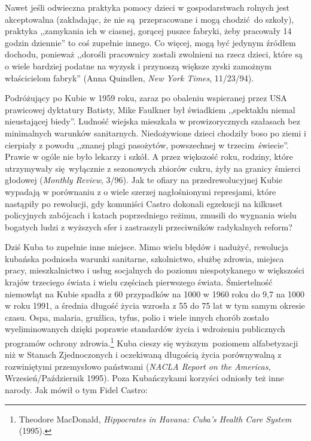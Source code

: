\documentclass[12pt]{book}
\begin{document}
Nawet jeśli odwieczna praktyka pomocy dzieci w gospodarstwach rolnych jest akceptowalna (zakładając, że nie są przepracowane i mogą chodzić do szkoły), praktyka ,,zamykania ich w ciasnej, gorącej puszce fabryki, żeby pracowały 14 godzin dziennie'' to coś zupełnie innego. Co więcej, mogą być jedynym źródłem dochodu, ponieważ ,,dorośli pracownicy zostali zwolnieni na rzecz dzieci, które są o wiele bardziej podatne na wyzysk i przynoszą większe zyski zamożnym właścicielom fabryk'' (Anna Quindlen, \textit{New York Times}, 11/23/94).

Podróżujący po Kubie w 1959 roku, zaraz po obaleniu wspieranej przez USA prawicowej dyktatury Batisty, Mike Faulkner był świadkiem ,,spektaklu niemal nieustającej biedy''. Ludność wiejska mieszkała w prowizorycznych szałasach bez minimalnych warunków sanitarnych. Niedożywione dzieci chodziły boso po ziemi i cierpiały z powodu ,,znanej plagi pasożytów, powszechnej w trzecim świecie''. Prawie w ogóle nie było lekarzy i szkół. A przez większość roku, rodziny, które utrzymywały się wyłącznie z sezonowych zbiorów cukru, żyły na granicy śmierci głodowej (\textit{Monthly Review}, 3/96). Jak te ofiary na przedrewolucyjnej Kubie wypadają w porównaniu z o wiele szerzej nagłośnionymi represjami, które nastąpiły po rewolucji, gdy komuniści Castro dokonali egzekucji na kilkuset policyjnych zabójcach i katach poprzedniego reżimu, zmusili do wygnania wielu bogatych ludzi z wyższych sfer i zastraszyli przeciwników radykalnych reform?

Dziś Kuba to zupełnie inne miejsce. Mimo wielu błędów i nadużyć, rewolucja kubańska podniosła warunki sanitarne, szkolnictwo, służbę zdrowia, miejsca pracy, mieszkalnictwo i usług socjalnych do poziomu niespotykanego w większości krajów trzeciego świata i wielu częściach pierwszego świata. Śmiertelność niemowląt na Kubie spadła z 60 przypadków na 1000 w 1960 roku do 9,7 na 1000 w roku 1991, a średnia długość życia wzrosła z 55 do 75 lat w tym samym okresie czasu. Ospa, malaria, gruźlica, tyfus, polio i wiele innych chorób zostało wyeliminowanych dzięki poprawie standardów życia i wdrożeniu publicznych programów ochrony zdrowia.\footnote{Theodore MacDonald, \textit{Hippocrates in Havana: Cuba's Health Care System} (1995).} Kuba cieszy się wyższym poziomem alfabetyzacji niż w Stanach Zjednoczonych i oczekiwaną długością życia porównywalną z rozwiniętymi przemysłowo państwami (\textit{NACLA Report on the Americas}, Wrzesień/Październik 1995). Poza Kubańczykami korzyści odniosły też inne narody. Jak mówił o tym Fidel Castro:
\end{document}
